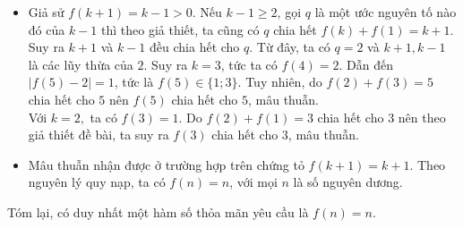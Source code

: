 \begin{bt}
{		\begin{itemize}
			\item Giả sử $f(k+1)=k-1>0$. Nếu $k-1\ge 2$, gọi $q$ là một ước nguyên tố nào đó của $k-1$ thì theo giả thiết, ta cũng có $q$ chia hết $f(k)+f(1)=k+1$. Suy ra $k+1$ và $k-1$ đều chia hết cho $q$. Từ đây, ta có $q=2$ và $k+1, k-1$ là các lũy thừa của $2$. Suy ra $k=3$, tức  ta có $f(4)=2$. Dẫn đến $|f(5)-2|=1$, tức là $f(5)\in \{1;3\}$. Tuy nhiên, do $f(2)+f(3)=5$ chia hết cho $5$ nên $f(5)$ chia hết cho $5$, mâu thuẫn.\\
			Với $k=2,$ ta có $f(3)=1$. Do $f(2)+f(1)=3$ chia hết cho $3$ nên theo giả thiết đề bài, ta suy ra $f(3)$ chia hết cho $3$, mâu thuẫn.
			\item Mâu thuẫn nhận được ở trường hợp trên chứng tỏ $f(k+1)=k+1$. Theo nguyên lý quy nạp, ta có $f(n)=n$, với mọi $n$ là số nguyên dương.
		\end{itemize}
		Tóm lại, có duy nhất một hàm số  thỏa mãn yêu cầu là $f(n)=n.$
		
		
	}
\end{bt}

